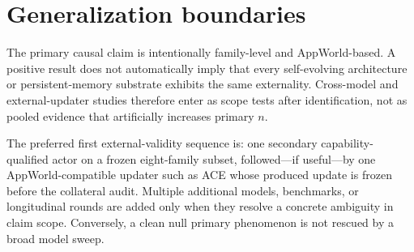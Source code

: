 \documentclass{article}
\begin{document}
\section{Generalization boundaries}
\label{app:generalization}
The primary causal claim is intentionally family-level and AppWorld-based. A positive result does not automatically imply that every self-evolving architecture or persistent-memory substrate exhibits the same externality. Cross-model and external-updater studies therefore enter as scope tests after identification, not as pooled evidence that artificially increases primary $n$.

The preferred first external-validity sequence is: one secondary capability-qualified actor on a frozen eight-family subset, followed---if useful---by one AppWorld-compatible updater such as ACE whose produced update is frozen before the collateral audit. Multiple additional models, benchmarks, or longitudinal rounds are added only when they resolve a concrete ambiguity in claim scope. Conversely, a clean null primary phenomenon is not rescued by a broad model sweep.



\end{document}
